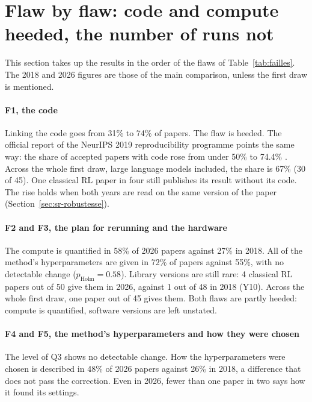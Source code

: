 
\section{Flaw by flaw: code and compute heeded, the number of runs not}\label{sec:sr-failles}

This section takes up the results in the order of the flaws of Table~\ref{tab:failles}. The 2018 and
2026 figures are those of the main comparison, unless the first draw is mentioned.

\paragraph{F1, the code}
Linking the code goes from 31\% to 74\% of papers. The flaw is heeded. The official report of the
NeurIPS 2019 reproducibility programme points the same way: the share of accepted papers with code rose
from under 50\% to 74.4\% \parencite{pineau2021improving}. Across the whole first draw, large language
models included, the share is 67\% (30 of 45). One classical RL paper in four still publishes its
result without its code. The rise holds when both years are read on the same version of the paper
(Section~\ref{sec:sr-robustesse}).

\paragraph{F2 and F3, the plan for rerunning and the hardware}
The compute is quantified in 58\% of 2026 papers against 27\% in 2018. All of the method's
hyperparameters are given in 72\% of papers against 55\%, with no detectable change
($p_{\text{Holm}} = 0.58$). Library versions are still rare: 4 classical RL papers out of 50 give them
in 2026, against 1 out of 48 in 2018 (Y10). Across the whole first draw, one paper out of 45 gives
them. Both flaws are partly heeded: compute is quantified, software versions are left unstated.

\paragraph{F4 and F5, the method's hyperparameters and how they were chosen}
The level of Q3 shows no detectable change. How the hyperparameters were chosen is described in 48\%
of 2026 papers against 26\% in 2018, a difference that does not pass the correction. Even in 2026, fewer than
one paper in two says how it found its settings.

